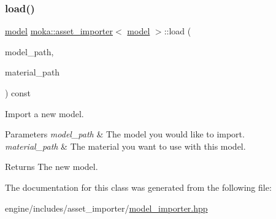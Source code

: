 \subsubsection{\texorpdfstring{load()}{load()}}
{\footnotesize\ttfamily \mbox{\hyperlink{classmoka_1_1model}{model}} \mbox{\hyperlink{classmoka_1_1asset__importer}{moka\+::asset\+\_\+importer}}$<$ \mbox{\hyperlink{classmoka_1_1model}{model}} $>$\+::load (\begin{DoxyParamCaption}\item[{const std\+::filesystem\+::path \&}]{model\+\_\+path,  }\item[{const std\+::filesystem\+::path \&}]{material\+\_\+path }\end{DoxyParamCaption}) const}



Import a new model. 


\begin{DoxyParams}{Parameters}
{\em model\+\_\+path} & The model you would like to import. \\
\hline
{\em material\+\_\+path} & The material you want to use with this model. \\
\hline
\end{DoxyParams}
\begin{DoxyReturn}{Returns}
The new model. 
\end{DoxyReturn}


The documentation for this class was generated from the following file\+:\begin{DoxyCompactItemize}
\item 
engine/includes/asset\+\_\+importer/\mbox{\hyperlink{model__importer_8hpp}{model\+\_\+importer.\+hpp}}\end{DoxyCompactItemize}
